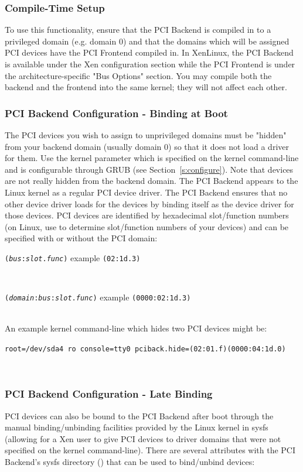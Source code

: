 \documentclass[11pt,twoside,final,openright]{report}
\begin{document}
\subsubsection{Compile-Time Setup}
To use this functionality, ensure
that the PCI Backend is compiled in to a privileged domain (e.g. domain 0)
and that the domains which will be assigned PCI devices have the PCI Frontend
compiled in. In XenLinux, the PCI Backend is available under the Xen
configuration section while the PCI Frontend is under the
architecture-specific "Bus Options" section. You may compile both the backend
and the frontend into the same kernel; they will not affect each other.

\subsubsection{PCI Backend Configuration - Binding at Boot}
The PCI devices you wish to assign to unprivileged domains must be "hidden"
from your backend domain (usually domain 0) so that it does not load a driver
for them. Use the  kernel parameter which is specified on
the kernel command-line and is configurable through GRUB (see
Section~\ref{s:configure}). Note that devices are not really hidden from the
backend domain. The PCI Backend appears to the Linux kernel as a regular PCI
device driver. The PCI Backend ensures that no other device driver loads
for the devices by binding itself as the device driver for those devices.
PCI devices are identified by hexadecimal slot/function numbers (on Linux,
use  to determine slot/function numbers of your devices) and
can be specified with or without the PCI domain: \\
\centerline{  {\tt ({\em bus}:{\em slot}.{\em func})} example {\tt (02:1d.3)}} \\
\centerline{  {\tt ({\em domain}:{\em bus}:{\em slot}.{\em func})} example {\tt (0000:02:1d.3)}} \\

An example kernel command-line which hides two PCI devices might be: \\
\centerline{ {\tt root=/dev/sda4 ro console=tty0 pciback.hide=(02:01.f)(0000:04:1d.0) } } \\

\subsubsection{PCI Backend Configuration - Late Binding}
PCI devices can also be bound to the PCI Backend after boot through the manual
binding/unbinding facilities provided by the Linux kernel in sysfs (allowing
for a Xen user to give PCI devices to driver domains that were not specified
on the kernel command-line). There are several attributes with the PCI
Backend's sysfs directory () that can be
used to bind/unbind devices:
\end{document}
